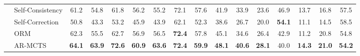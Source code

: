 \begin{table}[t]
{\begin{tabular}{llcccccccccccccc}
            & Self-Consistency & 61.2 & 54.8 & 61.8 & 56.2 & 55.2 & 72.1 & 57.6 & 41.9 & 33.9 & 23.6 & 46.9 & 13.7 & 16.8 & 57.5 \\
            & Self-Correction & 50.8 & 43.3 & 53.2 & 45.9 & 43.9 & 62.1 & 52.3 & 38.6 & 26.7 & 20.0 & \textbf{54.1} & 11.1 & 14.5 & 58.5 \\
            & ORM & 62.3 & 55.5 & 62.7 & 56.9 & 56.5 & \textbf{72.4} & 57.8 & 45.1 & 34.6 & 26.4 & 42.9 & 11.2 & 20.8 & 54.8 \\
& \cellcolor{gray!15}AR-MCTS & \cellcolor{gray!15}\textbf{64.1} &\cellcolor{gray!15}\textbf{63.9} &\cellcolor{gray!15}\textbf{72.6} &\cellcolor{gray!15}\textbf{60.9} &\cellcolor{gray!15}\textbf{63.6} & \cellcolor{gray!15}\textbf{72.4} & \cellcolor{gray!15}\textbf{59.9} & \cellcolor{gray!15}\textbf{48.1} & \cellcolor{gray!15}\textbf{40.6} & \cellcolor{gray!15}\textbf{28.1} & \cellcolor{gray!15}40.0 & \cellcolor{gray!15}\textbf{14.3} & \cellcolor{gray!15}\textbf{21.0} & \cellcolor{gray!15}\textbf{54.2} \\
            \bottomrule
        \end{tabular}
    }
    \label{tab:main_result}
\end{table}

